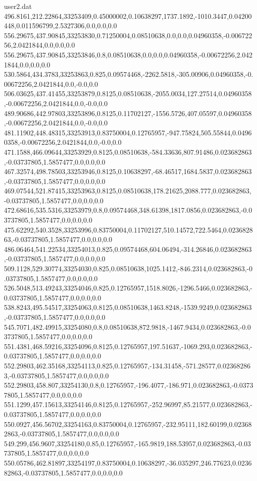 \begin{filecontents}{user2.dat}
496.8161,212.22864,33253409,0.45000002,0.10638297,1737.1892,-1010.3447,0.04200448,0.011596799,2.5327306,0.0,0.0,0.0
556.29675,437.90845,33253830,0.71250004,0.08510638,0.0,0.0,0.04960358,-0.00672256,2.0421844,0.0,0.0,0.0
556.29675,437.90845,33253846,0.8,0.08510638,0.0,0.0,0.04960358,-0.00672256,2.0421844,0.0,0.0,0.0
530.5864,434.3783,33253863,0.825,0.09574468,-2262.5818,-305.00906,0.04960358,-0.00672256,2.0421844,0.0,-0.0,0.0
506.03625,437.41455,33253879,0.8125,0.08510638,-2055.0034,127.27514,0.04960358,-0.00672256,2.0421844,0.0,-0.0,0.0
489.90686,442.97803,33253896,0.8125,0.11702127,-1556.5726,407.05597,0.04960358,-0.00672256,2.0421844,0.0,-0.0,0.0
481.11902,448.48315,33253913,0.83750004,0.12765957,-947.75824,505.55844,0.04960358,-0.00672256,2.0421844,0.0,-0.0,0.0
471.1588,466.09644,33253929,0.8125,0.08510638,-584.33636,807.91486,0.023682863,-0.03737805,1.5857477,0.0,0.0,0.0
467.32574,498.78503,33253946,0.8125,0.10638297,-68.46517,1684.5837,0.023682863,-0.03737805,1.5857477,0.0,0.0,0.0
469.07544,521.87415,33253963,0.8125,0.08510638,178.21625,2088.777,0.023682863,-0.03737805,1.5857477,0.0,0.0,0.0
472.68616,535.5316,33253979,0.8,0.09574468,348.61398,1817.0856,0.023682863,-0.03737805,1.5857477,0.0,0.0,0.0
475.62292,540.3528,33253996,0.83750004,0.11702127,510.14572,722.5464,0.023682863,-0.03737805,1.5857477,0.0,0.0,0.0
486.06464,541.22534,33254013,0.825,0.09574468,604.06494,-314.26846,0.023682863,-0.03737805,1.5857477,0.0,0.0,0.0
509.1128,529.30774,33254030,0.825,0.08510638,1025.1412,-846.2314,0.023682863,-0.03737805,1.5857477,0.0,0.0,0.0
526.5048,513.49243,33254046,0.825,0.12765957,1518.8026,-1296.5466,0.023682863,-0.03737805,1.5857477,0.0,0.0,0.0
538.8243,495.54517,33254063,0.8125,0.08510638,1463.8248,-1539.9249,0.023682863,-0.03737805,1.5857477,0.0,0.0,0.0
545.7071,482.49915,33254080,0.8,0.08510638,872.9818,-1467.9434,0.023682863,-0.03737805,1.5857477,0.0,0.0,0.0
551.4381,468.59216,33254096,0.8125,0.12765957,197.51637,-1069.293,0.023682863,-0.03737805,1.5857477,0.0,0.0,0.0
552.29803,462.35168,33254113,0.825,0.12765957,-134.31458,-571.28577,0.023682863,-0.03737805,1.5857477,0.0,0.0,0.0
552.29803,458.807,33254130,0.8,0.12765957,-196.4077,-186.971,0.023682863,-0.03737805,1.5857477,0.0,0.0,0.0
551.1299,457.15613,33254146,0.8125,0.12765957,-252.96997,85.21577,0.023682863,-0.03737805,1.5857477,0.0,0.0,0.0
550.0927,456.56702,33254163,0.83750004,0.12765957,-232.95111,182.60199,0.023682863,-0.03737805,1.5857477,0.0,0.0,0.0
549.299,456.9607,33254180,0.85,0.12765957,-165.9819,188.53957,0.023682863,-0.03737805,1.5857477,0.0,0.0,0.0
550.05786,462.81897,33254197,0.83750004,0.10638297,-36.035297,246.77623,0.023682863,-0.03737805,1.5857477,0.0,0.0,0.0

\end{filecontents}
